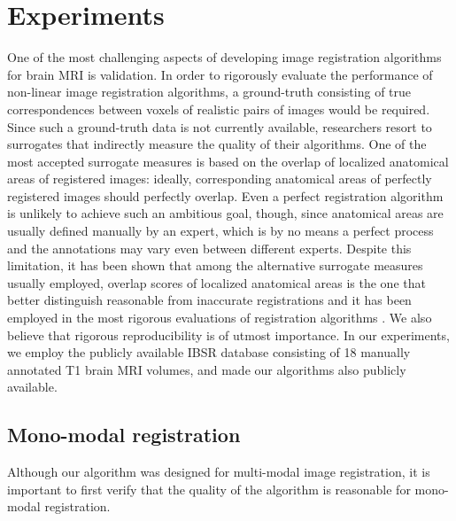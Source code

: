 \section{Experiments}
One of the most challenging aspects of developing image registration algorithms for brain MRI is validation. In order to rigorously evaluate the performance of non-linear
image registration algorithms, a ground-truth consisting of true correspondences between voxels of realistic pairs of images would be required. Since such a ground-truth data is
not currently available, researchers resort to surrogates that indirectly measure the quality of their algorithms. One of the most accepted surrogate measures is based
on the overlap of localized anatomical areas of registered images: ideally, corresponding anatomical areas of perfectly registered images should perfectly
overlap. Even a perfect registration algorithm is unlikely to achieve such an ambitious goal, though, since anatomical areas are usually defined manually by an expert, which is
by no means a perfect process and the annotations may vary even between different experts. Despite this limitation, it has been shown that among the alternative surrogate measures
usually employed, overlap scores of localized anatomical areas is the one that better distinguish reasonable from inaccurate registrations \cite{Rohlfing2012} and it has been employed
in the most rigorous evaluations of registration algorithms \cite{Klein2009}\cite{Rohlfing2012}. We also believe that rigorous reproducibility is of utmost importance. In our
experiments, we employ the publicly available IBSR database consisting of 18 manually annotated T1 brain MRI volumes, and made our algorithms also publicly available.

\subsection{Mono-modal registration}
Although our algorithm was designed for multi-modal image registration, it is important to first verify that the quality of the algorithm is reasonable for mono-modal registration.





